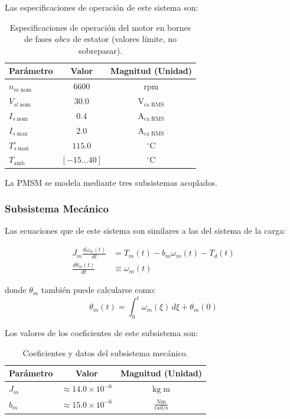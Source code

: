 \documentclass[blue,fullpaper]{ludusofficial}  %
\begin{document}
Las especificaciones de operación de este sistema son:

\begin{table}[htbp]
    \centering
    \caption{Especificaciones de operación del motor en bornes de fases $abcs$ de estator (valores límite, no sobrepasar).}
    \label{tab:parametros_carga}
    \begin{tabular}{lcc}
        \hline
        \textbf{Parámetro} & \textbf{Valor} & \textbf{Magnitud (Unidad)} \\
        \hline
        $n_{m \; \mathrm{nom}}$ & $6600$ & $\mathrm{rpm}$ \\
        $V_{sl \; \mathrm{nom}}$ & $30.0$ & $\mathrm{V_{ca \; RMS}}$ \\
        $I_{s \; \mathrm{nom}}$ & $0.4$ & $\mathrm{A_{ca \; RMS}}$ \\
        $I_{s \; \mathrm{max}}$ & $2.0$ & $\mathrm{A_{ca \; RMS}}$ \\
        $T_{s \; \mathrm{max}}^{\circ}$ & $115.0$ & $\mathrm{{}^{\circ}C}$ \\
        $T_{\mathrm{amb}}$ & $[-15 ... 40]$ & $\mathrm{{}^{\circ}C}$ \\
        \hline
    \end{tabular}
\end{table}

La PMSM se modela mediante tres subsistemas acoplados.




\subsubsection{Subsistema Mecánico}
Las ecuaciones que de este sistema son similares a las del sistema de la carga:

\begin{align}
    J_m \frac{d\omega_m(t)}{dt} &= T_m(t) - b_m \omega_m(t) - T_d(t) \label{SubMec1}\\
    \frac{d\theta_m(t)}{dt} &\equiv \omega_m(t)  \label{SubMec2}
\end{align}

donde $\theta_m$ también puede calcularse como:
\[
\theta_{m}(t) = \int_{0}^{t} \omega_{m}(\xi) \, d\xi + \theta_{m}(0) 
\]

Los valores de los coeficientes de este subsistema son:
\begin{table}[htbp]
    \centering
    \caption{Coeficientes y datos del subsistema mecánico.}
    \label{tab:parametros_carga}
    \begin{tabular}{lcc}
        \hline
        \textbf{Parámetro} & \textbf{Valor} & \textbf{Magnitud (Unidad)} \\
        \hline
        $J_m$ & $\approx 14.0 \times 10^{-6}$ & $\mathrm{\mathrm{kg \; m}}$ \\
        $b_m$ & $\approx 15.0 \times 10^{-6}$ & $\mathrm{\mathrm{\frac{Nm}{rad/s}}}$ \\
        \hline
    \end{tabular}
\end{table}
\end{document}
